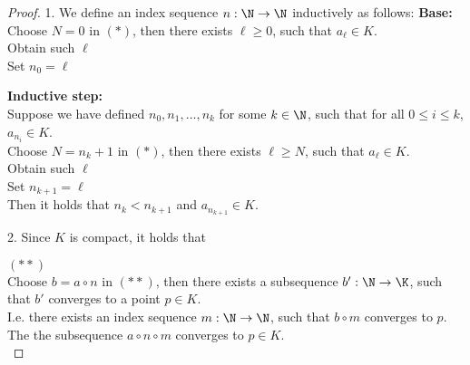 \documentclass{assignment}
\begin{document}
\begin{proof}
    1. We define an index sequence $n: \N \to \N$ inductively as follows:
    \textbf{Base:} \\
    Choose $N = 0$ in $(*)$, then there exists $\ell \ge 0$, such that $a_\ell \in K$.\\
    Obtain such $\ell$ \\
    Set $n_0 = \ell$

    \textbf{Inductive step:} \\
    Suppose we have defined $n_0, n_1, \dots, n_k$ for some $k \in \N$, such that for all $0 \le i \le k$, $a_{n_i} \in K$.\\
    Choose $N = n_k + 1$ in $(*)$, then there exists $\ell \ge N$, such that $a_\ell \in K$.\\
    Obtain such $\ell$ \\
    Set $n_{k+1} = \ell$ \\
    Then it holds that $n_k < n_{k+1}$ and $a_{n_{k+1}} \in K$.

    2. Since $K$ is compact, it holds that 
    \begin{myCenter}
    \end{myCenter}
    \vspace*{-\dimexpr\parskip+1\baselineskip}\hfill$(**)$ \\
    Choose $b = a \circ n$ in $(**)$, then there exists a subsequence $b': \N \to \K$, such that $b'$ converges to a point $p \in K$.\\
    I.e. there exists an index sequence $m: \N \to \N$, such that $b \circ m$ converges to $p$.\\
    The the subsequence $a \circ n \circ m$ converges to $p \in K$.\\
\end{proof}
\end{document}
